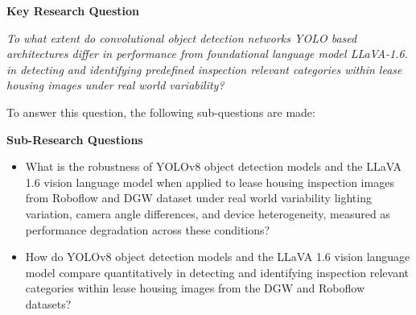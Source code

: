 \textbf{Key Research Question}

\emph{To what extent do convolutional object detection networks YOLO based architectures differ in performance from foundational language model LLaVA-1.6. in detecting and identifying predefined inspection relevant categories within lease housing images under real world variability?}

To answer this question, the following sub-questions are made:

\textbf{Sub-Research Questions}
\begin{itemize}

\item What is the robustness of YOLOv8 object detection models and the LLaVA 1.6 vision language model when applied to lease housing inspection images from Roboflow\cite{noauthor_roboflow_nodate} and DGW dataset under real world variability lighting variation, camera angle differences, and device heterogeneity, measured as performance degradation across these conditions?

\item How do YOLOv8\cite{jocher_ultralytics_2023} object detection models and the LLaVA 1.6 vision language model compare quantitatively in detecting and identifying inspection relevant categories within lease housing images from the DGW and Roboflow datasets?

\end{itemize}